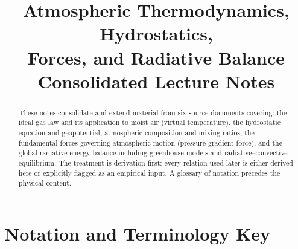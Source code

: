 \documentclass[11pt]{article}
\title{\vspace{-1.5cm}\textbf{Atmospheric Thermodynamics, Hydrostatics,\\ Forces, and Radiative Balance}\\[4pt]
\large Consolidated Lecture Notes}
\author{}
\date{}
\begin{document}
\maketitle
\thispagestyle{fancy}
\vspace{-1.2cm}

\begin{abstract}
\noindent These notes consolidate and extend material from six source documents covering: the ideal gas law and its application to moist air (virtual temperature), the hydrostatic equation and geopotential, atmospheric composition and mixing ratios, the fundamental forces governing atmospheric motion (pressure gradient force), and the global radiative energy balance including greenhouse models and radiative--convective equilibrium. The treatment is derivation-first: every relation used later is either derived here or explicitly flagged as an empirical input. A glossary of notation precedes the physical content.
\end{abstract}

\tableofcontents
\newpage

\section*{Notation and Terminology Key}
\end{document}
